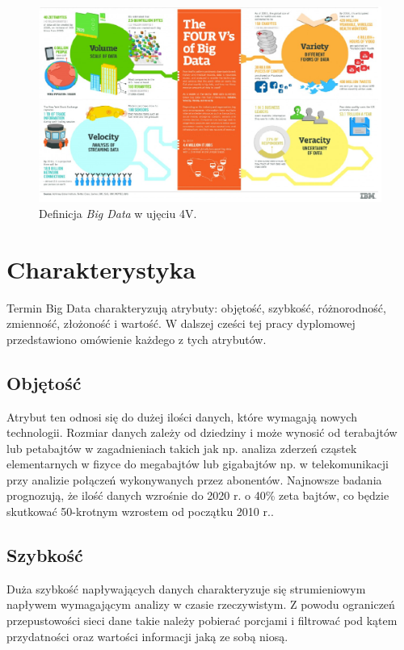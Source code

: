\begin{figure}[h] %
	\centering
	\includegraphics[width=1.0\linewidth]{img/big_data_4_v}
	\caption{Definicja \textit{Big Data} w ujęciu 4V.}
\end{figure}

\section{Charakterystyka}
Termin Big Data charakteryzują atrybuty: objętość, szybkość, różnorodność, zmienność, złożoność i wartość. W dalszej cześci tej pracy dyplomowej przedstawiono omówienie każdego z tych atrybutów.

\subsection{Objętość}
Atrybut ten odnosi się do dużej ilości danych, które wymagają nowych technologii. Rozmiar danych zależy od dziedziny i może wynosić od terabajtów lub petabajtów w zagadnieniach takich jak np. analiza zderzeń cząstek elementarnych w fizyce do megabajtów lub gigabajtów np. w telekomunikacji przy analizie połączeń wykonywanych przez abonentów. Najnowsze badania prognozują, że ilość danych wzrośnie do 2020 r. o 40\% zeta bajtów, co będzie skutkować 50-krotnym wzrostem od początku 2010 r..

\subsection{Szybkość}
Duża szybkość napływających danych charakteryzuje się strumieniowym napływem wymagającym analizy w czasie rzeczywistym. Z powodu ograniczeń przepustowości sieci dane takie należy pobierać porcjami i filtrować pod kątem przydatności oraz wartości informacji jaką ze sobą niosą.

